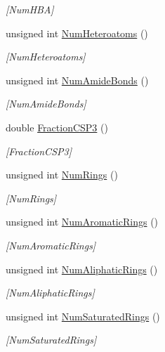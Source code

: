 \begin{DoxyCompactItemize}
\begin{DoxyCompactList}\small\item\em \mbox{[}Num\+H\+BA\mbox{]} \end{DoxyCompactList}\item 
unsigned int \mbox{\hyperlink{class_molecule_a582058277ae6808a93cf6ef186037eaa}{Num\+Heteroatoms}} ()
\begin{DoxyCompactList}\small\item\em \mbox{[}Num\+Heteroatoms\mbox{]} \end{DoxyCompactList}\item 
unsigned int \mbox{\hyperlink{class_molecule_a48326bca7f346cee15f4c6f251ba8788}{Num\+Amide\+Bonds}} ()
\begin{DoxyCompactList}\small\item\em \mbox{[}Num\+Amide\+Bonds\mbox{]} \end{DoxyCompactList}\item 
double \mbox{\hyperlink{class_molecule_a9fe4d5adae1305a7eeb0a7f4a7b5bcad}{Fraction\+C\+S\+P3}} ()
\begin{DoxyCompactList}\small\item\em \mbox{[}Fraction\+C\+S\+P3\mbox{]} \end{DoxyCompactList}\item 
unsigned int \mbox{\hyperlink{class_molecule_a0a3b03a9c5fcc9d24f2f285fdb68361a}{Num\+Rings}} ()
\begin{DoxyCompactList}\small\item\em \mbox{[}Num\+Rings\mbox{]} \end{DoxyCompactList}\item 
unsigned int \mbox{\hyperlink{class_molecule_a76554ff4fee44adcd1a1ca15eb8e8a7b}{Num\+Aromatic\+Rings}} ()
\begin{DoxyCompactList}\small\item\em \mbox{[}Num\+Aromatic\+Rings\mbox{]} \end{DoxyCompactList}\item 
unsigned int \mbox{\hyperlink{class_molecule_a6170e58d6f19e2023378975bcf93c8d7}{Num\+Aliphatic\+Rings}} ()
\begin{DoxyCompactList}\small\item\em \mbox{[}Num\+Aliphatic\+Rings\mbox{]} \end{DoxyCompactList}\item 
unsigned int \mbox{\hyperlink{class_molecule_a0c4eb1ffb0cc048b22a8298e3a9bc951}{Num\+Saturated\+Rings}} ()
\begin{DoxyCompactList}\small\item\em \mbox{[}Num\+Saturated\+Rings\mbox{]} \end{DoxyCompactList}\item 

\end{DoxyCompactItemize}
